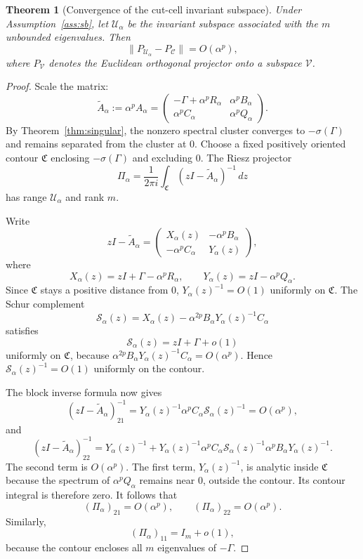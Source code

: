 \documentclass[preprint,12pt]{elsarticle}
\newtheorem{theorem}{Theorem}[section]
\begin{document}
\begin{theorem}[Convergence of the cut-cell invariant subspace]
\label{thm:proj}
Under Assumption~\ref{ass:sb}, let $\mathcal U_\alpha$ be the invariant subspace
associated with the $m$ unbounded eigenvalues.  Then
\begin{equation}
    \|P_{\mathcal U_\alpha}-P_{\mathcal C}\|=O(\alpha^p),
    \label{eq:proj}
\end{equation}
where $P_{\mathcal V}$ denotes the Euclidean orthogonal projector onto a
subspace $\mathcal V$.
\end{theorem}

\begin{proof}
Scale the matrix:
\[
 \widetilde A_\alpha:=\alpha^pA_\alpha
 =
 \begin{pmatrix}
     -\Gamma+\alpha^pR_\alpha & \alpha^pB_\alpha\\
     \alpha^pC_\alpha & \alpha^pQ_\alpha
 \end{pmatrix}.
\]
By Theorem~\ref{thm:singular}, the nonzero spectral cluster converges to
$-\sigma(\Gamma)$ and remains separated from the cluster at $0$.  Choose a
fixed positively oriented contour $\mathfrak C$ enclosing
$-\sigma(\Gamma)$ and excluding $0$.  The Riesz projector
\[
    \Pi_\alpha
    =
    \frac{1}{2\pi i}
    \int_{\mathfrak C}
    (zI-\widetilde A_\alpha)^{-1}\,dz
\]
has range $\mathcal U_\alpha$ and rank $m$.

Write
\[
 zI-\widetilde A_\alpha
 =
 \begin{pmatrix}
 X_\alpha(z) & -\alpha^pB_\alpha\\
 -\alpha^pC_\alpha & Y_\alpha(z)
 \end{pmatrix},
\]
where
\[
 X_\alpha(z)=zI+\Gamma-\alpha^pR_\alpha,
 \qquad
 Y_\alpha(z)=zI-\alpha^pQ_\alpha.
\]
Since $\mathfrak C$ stays a positive distance from $0$,
$Y_\alpha(z)^{-1}=O(1)$ uniformly on $\mathfrak C$.  The Schur complement
\[
 \mathcal S_\alpha(z)
 =
 X_\alpha(z)
 -
 \alpha^{2p}B_\alpha Y_\alpha(z)^{-1}C_\alpha
\]
satisfies
\[
 \mathcal S_\alpha(z)
 =
 zI+\Gamma+o(1)
\]
uniformly on $\mathfrak C$, because
$\alpha^{2p}B_\alpha Y_\alpha(z)^{-1}C_\alpha=O(\alpha^p)$.
Hence $\mathcal S_\alpha(z)^{-1}=O(1)$ uniformly on the contour.

The block inverse formula now gives
\[
 (zI-\widetilde A_\alpha)^{-1}_{21}
 =
 Y_\alpha(z)^{-1}\alpha^pC_\alpha\mathcal S_\alpha(z)^{-1}
 =
 O(\alpha^p),
\]
and
\[
 (zI-\widetilde A_\alpha)^{-1}_{22}
 =
 Y_\alpha(z)^{-1}
 +
 Y_\alpha(z)^{-1}\alpha^pC_\alpha\mathcal S_\alpha(z)^{-1}
 \alpha^pB_\alpha Y_\alpha(z)^{-1}.
\]
The second term is $O(\alpha^p)$.  The first term,
$Y_\alpha(z)^{-1}$, is analytic inside $\mathfrak C$ because the spectrum of
$\alpha^pQ_\alpha$ remains near $0$, outside the contour.  Its contour
integral is therefore zero.  It follows that
\[
    (\Pi_\alpha)_{21}=O(\alpha^p),
    \qquad
    (\Pi_\alpha)_{22}=O(\alpha^p).
\]
Similarly,
\[
    (\Pi_\alpha)_{11}=I_m+o(1),
\]
because the contour encloses all $m$ eigenvalues of $-\Gamma$.


\end{proof}
\end{document}

